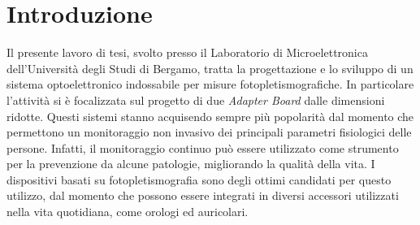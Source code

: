 \documentclass[
	a4paper,
	cleardoublepage=empty,
	headings=twolinechapter,
	numbers=autoenddot,
]{scrbook}
\begin{document}
	\frontmatter
	
	\begin{frontespizio}
		\Margini{3cm}{3cm}{3cm}{3cm}
		\Punteggiatura{}
		\begin{Preambolo*}
			\usepackage[italian]{babel}
			\usepackage[T1]{fontenc}
			\usepackage[utf8]{inputenc}
			\usepackage{microtype}
			\usepackage{lmodern}
			\graphicspath{{img/}}
			
			\renewcommand{\frontinstitutionfont}{\fontsize{14}{17}\bfseries\scshape}
			\renewcommand{\fronttitlefont}{\fontsize{17}{21}\bfseries\scshape}
			\renewcommand{\frontfootfont}{\fontsize{12}{14}\bfseries\scshape}
		\end{Preambolo*}
	\end{frontespizio}
	
	\tableofcontents
	\listoffigures
	\mainmatter
	
	\chapter*{Introduzione}
	Il presente lavoro di tesi, svolto presso il Laboratorio di Microelettronica dell’Università degli Studi di Bergamo, tratta la progettazione e lo sviluppo di un sistema optoelettronico indossabile per misure fotopletismografiche. In particolare l'attività si è focalizzata sul progetto di due \textit{Adapter Board} dalle dimensioni ridotte. Questi sistemi stanno acquisendo sempre più popolarità dal momento che permettono un monitoraggio non invasivo dei principali parametri fisiologici delle persone. Infatti, il monitoraggio continuo può essere utilizzato come strumento per la prevenzione da alcune patologie, migliorando la qualità della vita. I dispositivi basati su fotopletismografia sono degli ottimi candidati per questo utilizzo, dal momento che possono essere integrati in diversi accessori utilizzati nella vita quotidiana, come orologi ed auricolari.
	
\end{document}
